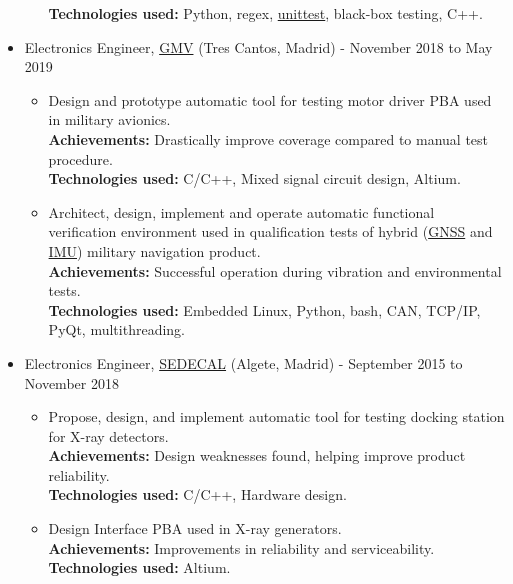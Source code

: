 \documentclass[11pt]{article}
\begin{document}
\begin{itemize}
\begin{itemize}
\textbf{Technologies used:} Python, regex, \href{https://docs.python.org/3/library/unittest.html}{unittest}, black-box testing, C++.\\[0pt]
\end{itemize}
\item Electronics Engineer, \href{https://www.gmv.com/en/}{GMV} (Tres Cantos, Madrid) - November 2018 to May 2019\\[0pt]
\begin{itemize}
\item Design and prototype automatic tool for testing motor driver PBA used in military avionics.\\[0pt]
\textbf{Achievements:} Drastically improve coverage compared to manual test procedure.\\[0pt]
\textbf{Technologies used:} C/C++, Mixed signal circuit design, Altium.\\[0pt]
\item Architect, design, implement and operate automatic functional verification environment used in qualification tests of hybrid (\href{https://www.gps.gov/systems/gnss/}{GNSS} and \href{https://en.wikipedia.org/wiki/Inertial\_measurement\_unit}{IMU}) military navigation product.\\[0pt]
\textbf{Achievements:} Successful operation during vibration and environmental tests.\\[0pt]
\textbf{Technologies used:} Embedded Linux, Python, bash, CAN, TCP/IP, PyQt, multithreading.\\[0pt]
\end{itemize}
\item Electronics Engineer, \href{https://www.sedecal.com/en/}{SEDECAL} (Algete, Madrid) - September 2015 to November 2018\\[0pt]
\begin{itemize}
\item Propose, design, and implement automatic tool for testing docking station for X-ray detectors.\\[0pt]
\textbf{Achievements:} Design weaknesses found, helping improve product reliability.\\[0pt]
\textbf{Technologies used:} C/C++, Hardware design.\\[0pt]
\item Design Interface PBA used in X-ray generators.\\[0pt]
\textbf{Achievements:} Improvements in reliability and serviceability.\\[0pt]
\textbf{Technologies used:} Altium.\\[0pt]

\end{itemize}
\end{itemize}
\end{document}
